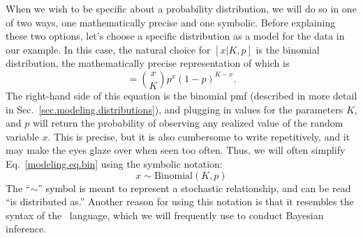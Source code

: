When
we wish to be specific about a probability distribution, we will do
so in one of two ways, one mathematically precise and one symbolic. Before explaining
these two options, let's choose a specific distribution as a model for
the data in our example. In this case, the natural choice for
$[x|K,p]$ is the binomial distribution, the mathematically precise representation of
which is
\begin{equation}
  [x|K,p] = %
             \binom{x}{K}p^x(1-p)^{K-x}.
  \label{modeling.eq.bin}
\end{equation}
The right-hand side of this equation is the binomial pmf (described in
more detail in Sec.~\ref{sec.modeling.distributions}), and plugging in
values for the parameters $K$, and $p$ will return the probability of
observing any realized value of the random variable $x$. This is precise, but it is also
cumbersome to write repetitively, and it may make the eyes glaze over
when seen too often. Thus, we will
often simplify Eq.~\ref{modeling.eq.bin} using the symbolic notation:
\begin{equation}
  x \sim \text{Binomial}(K, p)
  \label{modeling.eq.binsym}
\end{equation}
The ``$\sim$'' symbol is meant to represent a stochastic relationship, and
can be read ``is distributed as.''
Another reason for using this notation is that
it resembles the syntax of the \bugs~language, which we will
frequently use to conduct Bayesian inference.

